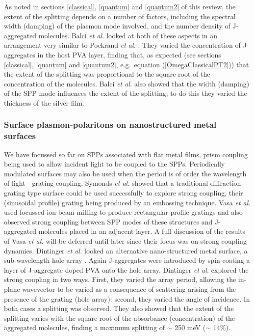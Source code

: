 \documentclass[12pt]{iopart}
\begin{document}
As noted in sections \ref{classical}, \ref{quantum} and \ref{quantum2} of this review, the extent of the splitting depends on a number of factors, including the spectral width (damping) of the plasmon mode involved, and the number density of J-aggregated molecules. Balci {\it et al.} \cite{Balci2012} looked at both of these aspects in an arrangement very similar to Pockrand {\it et al.} \cite{Pockrand_JChemPhys_1982_77_6289}. They varied the concentration of J-aggregates in the host PVA layer, finding that, as expected (see sections \ref{classical}, \ref{quantum} and \ref{quantum2}, e.g.\ equation (\ref{OmegaClassicalPT2})) that the extent of the splitting was proportional to the square root of the concentration of the molecules. Balci {\it et al.} \cite{Balci2012} also showed that the width (damping) of the SPP mode influences the extent of the splitting; to do this they varied the thickness of the silver film.

\subsubsection{Surface plasmon-polaritons on nanostructured metal surfaces} \label{Nanostructured}

We have focussed so far on SPPs associated with flat metal films, prism coupling being used to allow incident light to be coupled to the SPPs. Periodically modulated surfaces may also be used when the period is of order the wavelength of light - grating coupling. Symonds {\it et al.} \cite{Symonds_NJP_2008_10_065017} showed that a traditional diffraction grating type surface could be used successfully to explore strong coupling, their (sinusoidal profile) grating being produced by an embossing technique. Vasa {\it et al.} \cite{Vasa2010,Vasa2013} used focussed ion-beam milling to produce rectangular profile gratings and also observed strong coupling between SPP modes of these structures and J-aggregated molecules placed in an adjacent layer. A full discussion of the results of Vasa {\it et al.} will be deferred until later since their focus was on strong coupling dynamics. Dintinger {\it et al.} looked an alternative nano-structured metal surface, a sub-wavelength hole array \cite{Dintinger2005}. Again J-aggregates were introduced by spin coating a layer of J-aggregate doped PVA onto the hole array. Dintinger {\it et al.} explored the strong coupling in two ways. First, they varied the array period, allowing the in-plane wavevector to be varied as a consequence of scattering arising from the presence of the grating (hole array): second, they varied the angle of incidence. In both cases a splitting was observed. They also showed that the extent of the splitting varies with the square root of the absorbance (concentration) of the aggregated molecules, finding a maximum splitting of $\sim$ 250 meV ($\sim$ 14\%).
\end{document}
